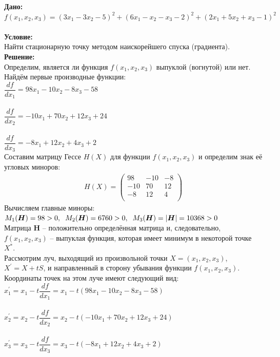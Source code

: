 \documentclass[14pt,a4paper,fleqn]{extarticle}
\begin{document}
	\textbf{Дано:}\\
	$f(x_1,x_2,x_3) = (3x_1-3x_2-5)^2 + (6x_1-x_2-x_3-2)^2+(2x_1+5x_2+x_3-1)^2$\\\\
	\textbf{Условие:}\\
	Найти стационарную точку методом наискорейшего спуска (градиента).\\
	
	\textbf{Решение:}\\
	Определим, является ли функция $f(x_1,x_2,x_3)$ выпуклой (вогнутой) или нет.\\
	Найдём первые производные функции:\\
	
	$\dfrac{df}{dx_1} = 98x_1 - 10x_2 - 8x_3 - 58$\\\\
	$\dfrac{df}{dx_2} = -10x_1 + 70x_2 + 12x_3 + 24$\\\\
	$\dfrac{df}{dx_3} = -8x_1 + 12x_2 + 4x_3 + 2$\\
	
	Составим матрицу Гессе $H(X)$ для функции $f(x_1,x_2,x_3)$ и определим знак её угловых миноров:
	\begin{align*}
		H(X) = \begin{pmatrix}
			98 & -10 & -8\\
			-10 & 70 & 12\\
			-8 & 12 & 4\\
		\end{pmatrix}
	\end{align*}
	Вычисляем главные миноры:\\
	$M_1(\boldsymbol{H}) = 98 > 0, \hspace*{0.2cm} M_2(\boldsymbol{H}) = 6760 > 0, \hspace*{0.2cm} M_3(\boldsymbol{H}) = |\boldsymbol{H}| = 10368 > 0$\\
	
	Матрица \textbf{H} -- положительно определённая матрица и, следовательно, $f(x_1, x_2, x_3)$ -- выпуклая функция, которая имеет минимум в некоторой точке $X^*$.\\
	Рассмотрим луч, выходящий из произвольной точки $X = (x_1, x_2, x_3)$, $X^{'} = X + tS$, и направленный в сторону убывания функции $f(x_1, x_2, x_3)$.
	\newpage
	Координаты точек на этом луче имеют следующий вид:\\
	$x_1^{'} = x_1 - t \dfrac{df}{dx_1} = x_1 - t(98x_1 - 10x_2 - 8x_3 - 58)$\\\\
	$x_2^{'} = x_2 - t \dfrac{df}{dx_2} = x_2 - t(-10x_1 + 70x_2 + 12x_3 + 24)$\\\\
	$x_3^{'} = x_3 - t \dfrac{df}{dx_3} = x_3 - t(-8x_1 + 12x_2 + 4x_3 + 2)$\\
	
\end{document}
